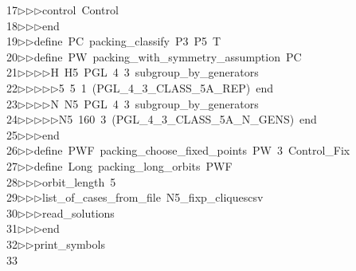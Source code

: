 \begin{tabbing}
17\>$\triangleright$\>$\triangleright$\>$\triangleright$\>control\ Control\ \\[0pt]
18\>$\triangleright$\>$\triangleright$\>$\triangleright$\>end\ \\[0pt]
19\>$\triangleright$\>$\triangleright$\>define\ PC\ packing\_classify\ P3\ P5\ T\ \\[0pt]
20\>$\triangleright$\>$\triangleright$\>define\ PW\ packing\_with\_symmetry\_assumption\ PC\ \\[0pt]
21\>$\triangleright$\>$\triangleright$\>$\triangleright$\>$\triangleright$\>H\ H5\ PGL\ 4\ 3\ subgroup\_by\_generators\ \\[0pt]
22\>$\triangleright$\>$\triangleright$\>$\triangleright$\>$\triangleright$\>$\triangleright$\>5\ 5\ 1\ (PGL\_4\_3\_CLASS\_5A\_REP)\ end\ \\[0pt]
23\>$\triangleright$\>$\triangleright$\>$\triangleright$\>$\triangleright$\>N\ N5\ PGL\ 4\ 3\ subgroup\_by\_generators\ \\[0pt]
24\>$\triangleright$\>$\triangleright$\>$\triangleright$\>$\triangleright$\>$\triangleright$\>N5\ 160\ 3\ (PGL\_4\_3\_CLASS\_5A\_N\_GENS)\ end\ \\[0pt]
25\>$\triangleright$\>$\triangleright$\>$\triangleright$\>end\ \\[0pt]
26\>$\triangleright$\>$\triangleright$\>define\ PWF\ packing\_choose\_fixed\_points\ PW\ 3\ Control\_Fix\ \\[0pt]
27\>$\triangleright$\>$\triangleright$\>define\ Long\ packing\_long\_orbits\ PWF\ \\[0pt]
28\>$\triangleright$\>$\triangleright$\>$\triangleright$\>orbit\_length\ 5\ \\[0pt]
29\>$\triangleright$\>$\triangleright$\>$\triangleright$\>list\_of\_cases\_from\_file\ N5\_fixp\_cliquescsv\ \\[0pt]
30\>$\triangleright$\>$\triangleright$\>$\triangleright$\>read\_solutions\ \\[0pt]
31\>$\triangleright$\>$\triangleright$\>$\triangleright$\>end\ \\[0pt]
32\>$\triangleright$\>$\triangleright$\>print\_symbols\\[0pt]
33\>\end{tabbing}
